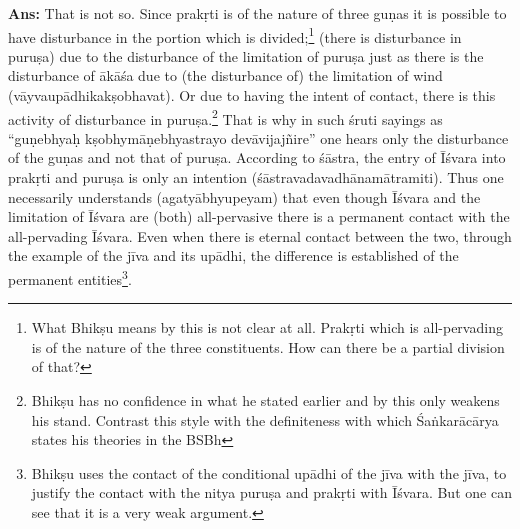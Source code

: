 \textbf{Ans:} That is not so. Since prakṛti is of the nature of three guṇas it is possible to have disturbance in the portion which is divided;\footnote{What Bhikṣu means by this is not clear at all. Prakṛti which is all-pervading is of the nature of the three constituents. How can there be a partial division of that?} (there is disturbance in puruṣa) due to the disturbance of the limitation of puruṣa just as there is the disturbance of ākāśa due to (the disturbance of) the limitation of wind (vāyvaupādhikakṣobhavat). Or due to having the intent of contact, there is this activity of disturbance in puruṣa.\footnote{Bhikṣu has no confidence in what he stated earlier and by this only weakens his stand. Contrast this style with the definiteness with which Śaṅkarācārya states his theories in the BSBh} That is why in such śruti sayings as “guṇebhyaḥ kṣobhymāṇebhyastrayo devāvijajñire” one hears only the disturbance of the guṇas and not that of puruṣa.  According to śāstra, the entry of Īśvara into prakṛti and puruṣa is only an intention (śāstravadavadhānamātramiti). Thus one necessarily understands (agatyābhyupeyam) that even though Īśvara and the limitation of Īśvara are (both) all-pervasive there is a permanent contact with the all-pervading Īśvara. Even when there is eternal contact between the two, through the example of the jīva and its upādhi, the difference is established of the permanent entities\footnote{Bhikṣu uses the contact of the conditional upādhi of the jīva with the jīva, to justify the contact with the nitya puruṣa and prakṛti with Īśvara. But one can see that it is a very weak argument.}. 

